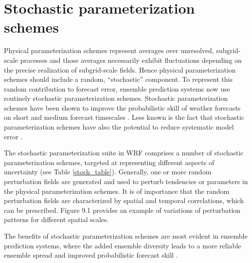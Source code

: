 \chapter{Stochastic parameterization schemes}
\label{stoch}

Physical parameterization schemes represent averages over unresolved,
subgrid-scale processes and those averages necessarily exhibit
fluctuations depending on the precise realization of subgrid-scale
fields.  Hence physical parameterization schemes should include a random,
``stochastic'' component.  To represent this random contribution to
forecast error, ensemble prediction systems now use routinely stochastic
parameterization schemes.
Stochastic parameterization schemes have been shown to improve the
probabilistic skill of weather forecasts on short and medium forecast
timescales 
\citep[e.g.][]{Be09,Be11,leutbecher2017stochastic}.
Less known is the fact that stochastic parameterization schemes have also the
potential to reduce systematic model error 
\citep[e.g.][]{berner2017stochastic}.

The stochastic parameterization suite in WRF comprises a number of
stochastic parameterization schemes, targeted at representing different aspects 
of uncertainty (see Table \ref{stoch_table}). Generally, one or more random
perturbation fields are generated and used to perturb tendencies or
parameters in the physical parameterization schemes.  It is of importance
that the random perturbation fields are characterized by spatial and temporal
correlations, which can be prescribed.  Figure 9.1 provides an example of 
variations of perturbation patterns for different spatial scales.

The benefits of stochastic parameterization schemes are most evident in ensemble 
prediction systems, where the added ensemble diversity leads to a more reliable 
ensemble spread and improved probabilistic forecast skill \citep[e.g.][]{Be15}.

